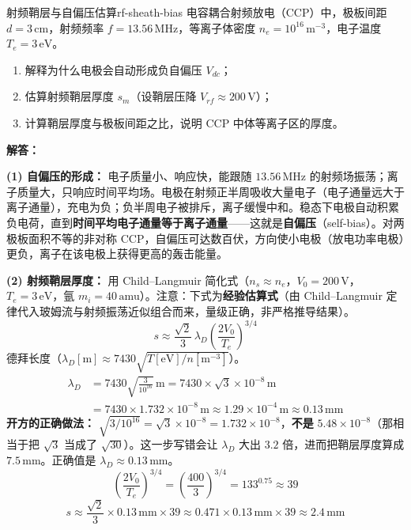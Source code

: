 
\begin{example}{射频鞘层与自偏压估算}{rf-sheath-bias}
电容耦合射频放电（CCP）中，极板间距 $d = 3\,\mathrm{cm}$，射频频率 $f = 13.56\,\mathrm{MHz}$，等离子体密度 $n_e = 10^{16}\,\mathrm{m^{-3}}$，电子温度 $T_e = 3\,\mathrm{eV}$。
\begin{enumerate}[label=(\arabic*)]
\item 解释为什么电极会自动形成负自偏压 $V_{dc}$；
\item 估算射频鞘层厚度 $s_m$（设鞘层压降 $V_{rf}\approx 200\,\mathrm{V}$）；
\item 计算鞘层厚度与极板间距之比，说明 CCP 中体等离子区的厚度。
\end{enumerate}
\tcblower
\textbf{解答：}

\textbf{(1) 自偏压的形成：} 电子质量小、响应快，能跟随 $13.56\,\mathrm{MHz}$ 的射频场振荡；离子质量大，只响应时间平均场。电极在射频正半周吸收大量电子（电子通量远大于离子通量），充电为负；负半周电子被排斥，离子缓慢中和。稳态下电极自动积累负电荷，直到\textbf{时间平均电子通量等于离子通量}——这就是\textbf{自偏压}（self-bias）。对两极板面积不等的非对称 CCP，自偏压可达数百伏，方向使小电极（放电功率电极）更负，离子在该电极上获得更高的轰击能量。

\textbf{(2) 射频鞘层厚度：} 用 Child--Langmuir 简化式（$n_s\approx n_e$，$V_0 = 200\,\mathrm{V}$，$T_e = 3\,\mathrm{eV}$，氩 $m_i = 40\,\mathrm{amu}$）。注意：下式为\textbf{经验估算式}（由 Child--Langmuir 定律代入玻姆流与射频振荡近似组合而来，量级正确，非严格推导结果）。
\[
s \approx \frac{\sqrt{2}}{3}\,\lambda_D\left(\frac{2V_0}{T_e}\right)^{3/4}
\]
德拜长度（$\lambda_D[\mathrm{m}]\approx7430\sqrt{T[\mathrm{eV}]/n[\mathrm{m^{-3}}]}$）。
\begin{align*}
\lambda_D &= 7430\sqrt{\frac{3}{10^{16}}}\,\mathrm{m}
= 7430\times\sqrt{3}\times10^{-8}\,\mathrm{m} \\
&= 7430\times1.732\times10^{-8}\,\mathrm{m}
\approx 1.29\times10^{-4}\,\mathrm{m} \approx 0.13\,\mathrm{mm}
\end{align*}
\textbf{开方的正确做法：} $\sqrt{3/10^{16}}=\sqrt3\times10^{-8}=1.732\times10^{-8}$，\textbf{不是} $5.48\times10^{-8}$（那相当于把 $\sqrt3$ 当成了 $\sqrt{30}$）。这一步写错会让 $\lambda_D$ 大出 $3.2$ 倍，进而把鞘层厚度算成 $7.5\,\mathrm{mm}$。正确值是 $\lambda_D\approx0.13\,\mathrm{mm}$。
\[
\left(\frac{2V_0}{T_e}\right)^{3/4} = \left(\frac{400}{3}\right)^{3/4} = 133^{0.75} \approx 39
\]
\[
s \approx \frac{\sqrt2}{3}\times0.13\,\mathrm{mm}\times39
\approx 0.471\times0.13\,\mathrm{mm}\times39 \approx 2.4\,\mathrm{mm}
\]


\end{example}
